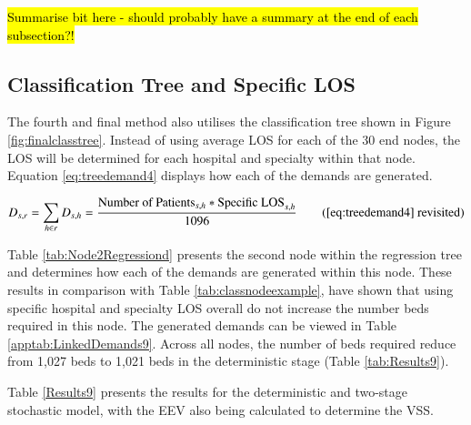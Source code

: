 \documentclass[../thesis.tex]{subfiles}
\begin{document}
\hl{Summarise bit here - should probably have a summary at the end of each subsection?!}


\subsection{Classification Tree and Specific LOS}


The fourth and final method also utilises the classification tree shown in Figure \ref{fig:finalclasstree}. Instead of using average LOS for each of the 30 end nodes, the LOS will be determined for each hospital and specialty within that node. Equation \eqref{eq:treedemand4} displays how each of the demands are generated.

\begin{equation}
        D_{s,r} = \sum\limits_{h \in r} D_{s,h} = \frac{\text{Number of Patients}_{s,h}*{\text{Specific LOS}_{s,h}}}{1096} \tag{\ref{eq:treedemand4} revisited}
\end{equation}

Table \ref{tab:Node2Regressiond} presents the second node within the regression tree and determines how each of the demands are generated within this node. These results in comparison with Table \ref{tab:classnodeexample}, have shown that using specific hospital and specialty LOS overall do not increase the number beds required in this node. The generated demands can be viewed in Table \ref{apptab:LinkedDemands9}. Across all nodes, the number of beds required reduce from 1,027 beds to  1,021 beds in the deterministic stage (Table \ref{tab:Results9}). 

\begin{table}[h!]
    \centering{}
    \caption{Classification Tree Node 2 - Specific LOS}
    \label{tab:Node2Regressiond}
\end{table}

Table \ref{Results9} presents the results for the deterministic and two-stage stochastic model, with the EEV also being calculated to determine the VSS.
\end{document}
